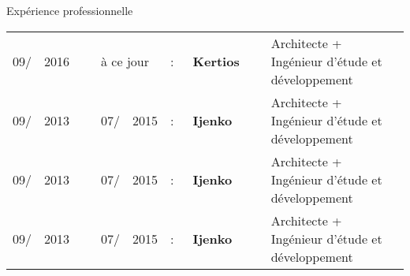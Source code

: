 \documentclass{cv}
\newcommand{\sectionSeparator}[1]{
   \vspace{10pt}
   \begin{tcolorbox}[notitle,
                     boxrule=0pt,
                     top=2pt,
                     bottom=2pt,
                     halign=center,
                     valign=center,
                     width=\textwidth,
                     colback={colorSection}]
      #1
   \end{tcolorbox}
   \vspace{10pt}
}
\newenvironment{packed_tabular}{
   \setlength{\tabcolsep}{0pt}
}
\newenvironment{absolutelynopagebreak}{
  \par\nobreak\vfil\penalty0\vfilneg
  \vtop\bgroup
}{\par\xdef\tpd{\the\prevdepth}\egroup\prevdepth=\tpd}
\begin{document}

   \begin{absolutelynopagebreak}
      \sectionSeparator{Expérience professionnelle}

      \begin{packed_tabular}
         \begin{tabular}{lclclclll}
             09/ & 2016 & ~ & \multicolumn{2}{l}{à ce jour} & :~ & \textbf{Kertios} & ~ &%
                 Architecte + Ingénieur d'étude et développement \\
             09/ & 2013 & ~ & 07/ & 2015                    & :~ & \textbf{Ijenko} & ~ &%
                 Architecte + Ingénieur d'étude et développement \\
             09/ & 2013 & ~ & 07/ & 2015                    & :~ & \textbf{Ijenko} & ~ &%
                 Architecte + Ingénieur d'étude et développement \\
             09/ & 2013 & ~ & 07/ & 2015                    & :~ & \textbf{Ijenko} & ~ &%
                 Architecte + Ingénieur d'étude et développement \\
         \end{tabular}%
      \end{packed_tabular}%
   \end{absolutelynopagebreak}%
\end{document}
